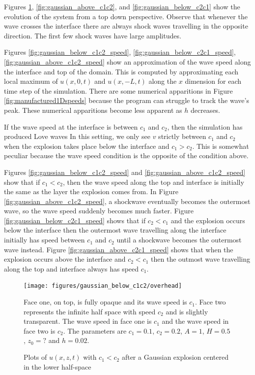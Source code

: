 \documentclass[11pt,letter,subeqn,fleqn]{article}
\numberwithin{equation}{section}
\numberwithin{table}{section}
\numberwithin{figure}{section}
\begin{document}
Figures \ref{fig:gaussian_below_c1c2}, \ref{fig:gaussian_above_c1c2}, and \ref{fig:gaussian_below_c2c1}
show the evolution of the system from a top down perspective. Observe that whenever the wave crosses the interface
there are always shock waves travelling in the opposite direction. The first few shock waves have large amplitudes.

Figures \ref{fig:gaussian_below_c1c2_speed}, \ref{fig:gaussian_below_c2c1_speed}, \ref{fig:gaussian_above_c1c2_speed}
show an approximation of the wave speed along the interface and top of the domain.
This is computed by approximating each local maximum of $u(x,0,t)$ and $u(x,-L,t)$ along the $x$ dimension for each time
step of the simulation. There are some numerical apparitions in Figure \ref{fig:manufactured1Dspeeds} because the program
can struggle to track the wave's peak. These numerical apparitions become less apparent as $h$ decreases.


If the wave speed at the interface is between $c_1$ and $c_2$, then the simulation has produced Love waves 
In this setting, we only see $v$ strictly between $c_1$ and $c_2$ when the explosion takes place
below the interface and $c_1>c_2$. This is somewhat peculiar because the wave speed condition is the opposite of
the condition above.

Figures \ref{fig:gaussian_below_c1c2_speed} and \ref{fig:gaussian_above_c1c2_speed} show that if
$c_1<c_2$, then the wave speed along the top and interface is initially the same as the layer the explosion comes
from. In Figure \ref{fig:gaussian_above_c1c2_speed}, a shockwave eventually becomes the outermost wave, so the
wave speed suddenly becomes much faster. Figure \ref{fig:gaussian_below_c2c1_speed} shows that if $c_2<c_1$ and
the explosion occurs below the interface then the outermost wave travelling along the interface initially has 
speed between $c_1$ and $c_2$ until a shockwave becomes the outermost wave instead. Figure \ref{fig:gaussian_above_c2c1_speed}
shows that when the explosion occurs above the interface and $c_2<c_1$ then the outmost wave travelling along the
top and interface always has speed $c_1$.

\begin{figure}[htbp]
	\caption{Plots of $u(x,z,t)$ with $c_1<c_2$ after a Gaussian explosion centered in the lower half-space}
	\label{fig:gaussian_below_c1c2}
	\texttt{[image: figures/gaussian\_below\_c1c2/overhead]}
\footnotesize
\centering

Face one, on top, is fully opaque and its wave speed is $c_1$. Face two represents the infinite half space with speed $c_2$ and is slightly transparent. The wave speed in face one is $c_1$ and the wave speed in face two is $c_2$. The parameters are $c_1 = 0.1$, $c_2 = 0.2$, $A=1$, $H=0.5$, $z_0=?$ and $h = 0.02$.
\end{figure}
\end{document}
